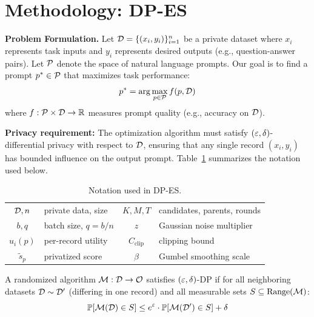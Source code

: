 \vspace{0.5em}
\section{Methodology: DP-ES}
\label{sec:methodology}
\enlargethispage{2\baselineskip}

\noindent\textbf{Problem Formulation.}
Let $\mathcal{D} = \{(x_i, y_i)\}_{i=1}^n$ be a private dataset where $x_i$ represents task inputs and $y_i$ represents desired outputs (e.g., question-answer pairs). Let $\mathcal{P}$ denote the space of natural language prompts. Our goal is to find a prompt $p^* \in \mathcal{P}$ that maximizes task performance:
\begin{equation}
p^* = \arg\max_{p \in \mathcal{P}} f(p, \mathcal{D})
\end{equation}
where $f: \mathcal{P} \times \mathcal{D} \to \mathbb{R}$ measures prompt quality (e.g., accuracy on $\mathcal{D}$).

\noindent\textbf{Privacy requirement:} The optimization algorithm must satisfy $(\varepsilon, \delta)$-differential privacy with respect to $\mathcal{D}$, ensuring that any single record $(x_i, y_i)$ has bounded influence on the output prompt.
Table~\ref{tab:notation} summarizes the notation used below.

\begin{table}[t]
\centering
\scriptsize
\setlength{\tabcolsep}{3pt}
\begin{tabular}{cl@{\qquad}cl}
\toprule
$\mathcal{D},n$ & private data, size & $K,M,T$ & candidates, parents, rounds \\
$b,q$ & batch size, $q=b/n$ & $z$ & Gaussian noise multiplier \\
$u_i(p)$ & per-record utility & $C_{\text{clip}}$ & clipping bound \\
$\widetilde{s}_p$ & privatized score & $\beta$ & Gumbel smoothing scale \\
\bottomrule
\end{tabular}
\caption{Notation used in DP-ES.}
\label{tab:notation}
\end{table}

\vspace{-0.5em}
\begin{definition}
\label{def:dp}
A randomized algorithm $\mathcal{M}: \mathcal{D} \to \mathcal{O}$ satisfies $(\varepsilon, \delta)$-DP if for all neighboring datasets $\mathcal{D} \sim \mathcal{D}'$ (differing in one record) and all measurable sets $S \subseteq \text{Range}(\mathcal{M})$:
\vspace{-0.8em}
\begin{equation}
\mathbb{P}[\mathcal{M}(\mathcal{D}) \in S] \leq e^\varepsilon \cdot \mathbb{P}[\mathcal{M}(\mathcal{D}') \in S] + \delta
\end{equation}
\end{definition}

